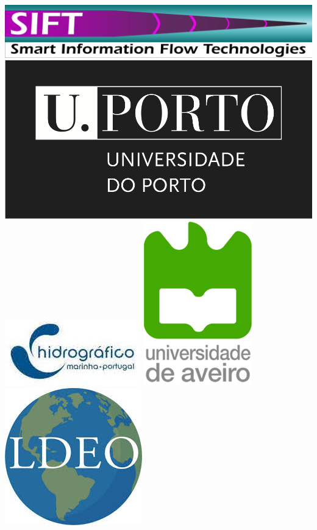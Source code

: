 \begin{titlepage}
\includegraphics[scale=0.06]{fig/sift.jpg}
\hspace{+0.6cm}\includegraphics[scale=0.25]{fig/uporto.png}
\hspace{+0.6cm}\includegraphics[scale=0.25]{fig/ih.jpg}
\hspace{+0.6cm}\includegraphics[scale=0.18]{fig/aveiro.png}
\hspace{+0.6cm}\includegraphics[scale=0.18]{fig/ldeo.jpg}

\end{titlepage}
